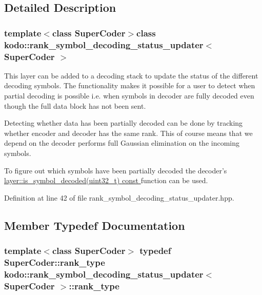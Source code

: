 \subsection{Detailed Description}
\subsubsection*{template$<$class Super\-Coder$>$class kodo\-::rank\-\_\-symbol\-\_\-decoding\-\_\-status\-\_\-updater$<$ Super\-Coder $>$}

This layer can be added to a decoding stack to update the status of the different decoding symbols. The functionality makes it possible for a user to detect when partial decoding is possible i.\-e. when symbols in decoder are fully decoded even though the full data block has not been sent. 

Detecting whether data has been partially decoded can be done by tracking whether encoder and decoder has the same rank. This of course means that we depend on the decoder performs full Gaussian elimination on the incoming symbols.

To figure out which symbols have been partially decoded the decoder's \hyperlink{group__decoder__api_gae4e6fba10d31bdd30b40f80d614faa4d}{layer\-::is\-\_\-symbol\-\_\-decoded(uint32\-\_\-t) const }function can be used. 

Definition at line 42 of file rank\-\_\-symbol\-\_\-decoding\-\_\-status\-\_\-updater.\-hpp.



\subsection{Member Typedef Documentation}
\hypertarget{classkodo_1_1rank__symbol__decoding__status__updater_a9ed8604c6f80b2408ca5a518aec17fd0}{
\subsubsection[{rank\-\_\-type}]{\setlength{\rightskip}{0pt plus 5cm}template$<$class Super\-Coder$>$ typedef Super\-Coder\-::rank\-\_\-type {\bf kodo\-::rank\-\_\-symbol\-\_\-decoding\-\_\-status\-\_\-updater}$<$ Super\-Coder $>$\-::{\bf rank\-\_\-type}}}\label{classkodo_1_1rank__symbol__decoding__status__updater_a9ed8604c6f80b2408ca5a518aec17fd0}




